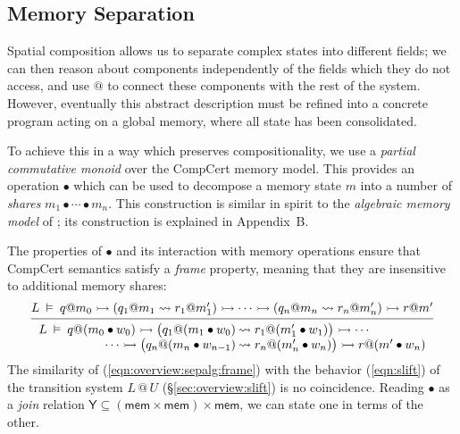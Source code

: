 \documentclass[acmsmall,screen,review,nonacm]{acmart}
\newcommand{\kw}[1]{\ensuremath{ \mathsf{#1} }}
\newcommand{\jr}{\mathsf{Y}}
\begin{document}
\subsection{Memory Separation}
\label{sec:application:sepalg} %

Spatial composition
allows us to separate
complex states into different fields;
we can then reason about components
independently of the fields which they do not access,
and use $\mathbin@$
to connect these components with the rest of the system.
However, eventually this abstract description
must be refined into a concrete program
acting on a global memory,
where all state has been consolidated.

To achieve this in a way which preserves compositionality,
we use a \emph{partial commutative monoid}
over the CompCert memory model.
This provides an operation $\bullet$
which can be used to decompose a memory state $m$ into
a number of \emph{shares}
$
  m_1 \bullet \cdots \bullet m_n
$.
This construction
is similar in spirit to the \emph{algebraic memory model}
of \citet{ccal};
its construction is explained in Appendix~B. %

The properties of $\bullet$
and its interaction with memory operations
ensure that CompCert semantics satisfy
a \emph{frame} property,
meaning that they are insensitive to
additional memory shares:
\begin{equation} \label{eqn:overview:sepalg:frame}
  \begin{prooftree}
  \hypo{
  L \:\vDash\: q@m_0 \rightarrowtail
    (q_1@m_1 \leadsto r_1@m_1') \rightarrowtail
    \cdots \rightarrowtail
    (q_n@m_n \leadsto r_n@m_n') \rightarrowtail
    r@m'}
  \infer1{
   {\begin{array}{r@{\:}l}
    L \:\vDash\: q@(m_0 \bullet w_0) \rightarrowtail
      \big( q_1@(m_1 \bullet w_0) &\leadsto r_1@(m_1' \bullet w_1) \big) \rightarrowtail
      \cdots \\ \cdots \rightarrowtail
      \big( q_n@(m_n \bullet w_{n-1}) &\leadsto r_n@(m_n' \bullet w_n) \big) \rightarrowtail
      r@(m' \bullet w_n)
   \end{array}} }
  \end{prooftree}
\end{equation}
The similarity of (\ref{eqn:overview:sepalg:frame})
with the behavior (\ref{eqn:slift})
of the transition system $L \mathbin@ U$ (\S\ref{sec:overview:slift})
is no coincidence.
Reading $\bullet$ as a \emph{join} relation
$\jr \subseteq (\kw{mem} \times \kw{mem}) \times \kw{mem}$,
we can state one in terms of the other.
\end{document}
